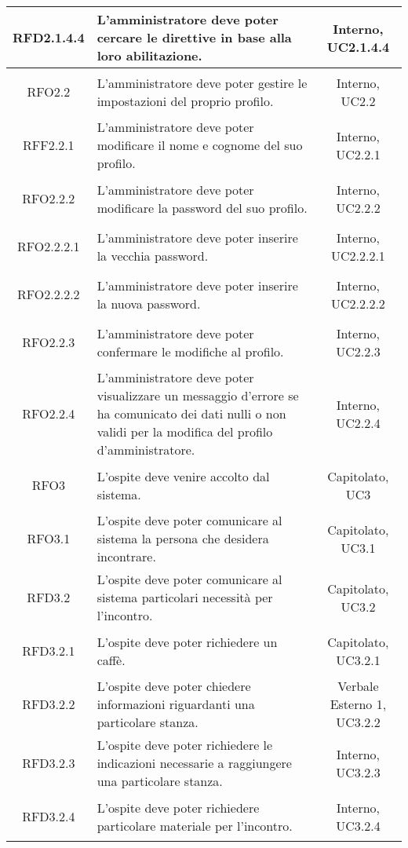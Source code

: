 \begin{longtable}{|c|>{\centering}m{7cm}|c|}
\hypertarget{RFD2.1.4.4}{RFD2.1.4.4} & L'amministratore deve poter cercare le direttive in base alla loro abilitazione. & Interno, UC2.1.4.4\\ \hline
\hypertarget{RFO2.2}{RFO2.2} & L'amministratore deve poter gestire le impostazioni del proprio profilo. & Interno, UC2.2\\ \hline
\hypertarget{RFF2.2.1}{RFF2.2.1} & L'amministratore deve poter modificare il nome e cognome del suo profilo. & Interno, UC2.2.1\\ \hline
\hypertarget{RFO2.2.2}{RFO2.2.2} & L'amministratore deve poter modificare la password del suo profilo. & Interno, UC2.2.2\\ \hline
\hypertarget{RFO2.2.2.1}{RFO2.2.2.1} & L'amministratore deve poter inserire la vecchia password. & Interno, UC2.2.2.1\\ \hline
\hypertarget{RFO2.2.2.2}{RFO2.2.2.2} & L'amministratore deve poter inserire la nuova password. & Interno, UC2.2.2.2\\ \hline
\hypertarget{RFO2.2.3}{RFO2.2.3} & L'amministratore deve poter confermare le modifiche al profilo. & Interno, UC2.2.3\\ \hline
\hypertarget{RFO2.2.4}{RFO2.2.4} & L'amministratore deve poter visualizzare un messaggio d'errore se ha comunicato dei dati nulli o non validi per la modifica del profilo d'amministratore. & Interno, UC2.2.4\\ \hline
\hypertarget{RFO3}{RFO3} & L'ospite deve venire accolto dal sistema. & Capitolato, UC3\\ \hline
\hypertarget{RFO3.1}{RFO3.1} & L'ospite deve poter comunicare al sistema la persona che desidera incontrare. & Capitolato, UC3.1\\ \hline
\hypertarget{RFD3.2}{RFD3.2} & L'ospite deve poter comunicare al sistema particolari necessità  per l'incontro. & Capitolato, UC3.2\\ \hline
\hypertarget{RFD3.2.1}{RFD3.2.1} & L'ospite deve poter richiedere un caffè. & Capitolato, UC3.2.1\\ \hline
\hypertarget{RFD3.2.2}{RFD3.2.2} & L'ospite deve poter chiedere informazioni riguardanti una particolare stanza. & Verbale Esterno 1, UC3.2.2\\ \hline
\hypertarget{RFD3.2.3}{RFD3.2.3} & L'ospite deve poter richiedere le indicazioni necessarie a raggiungere una particolare stanza. & Interno, UC3.2.3\\ \hline
\hypertarget{RFD3.2.4}{RFD3.2.4} & L'ospite deve poter richiedere particolare materiale per l'incontro. & Interno, UC3.2.4\\ \hline

\end{longtable}
